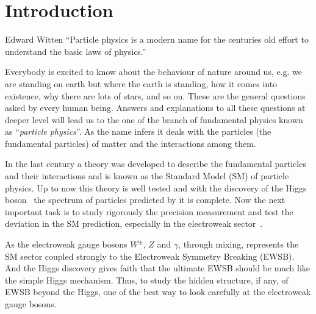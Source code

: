 \chapter{Introduction}
\begin{chapquote}
{Edward Witten}
``Particle physics is a modern name for the centuries old effort to understand the basic laws of physics.''
\end{chapquote}
Everybody is excited to know about the behaviour of nature around us, e.g. we are standing on earth but where the earth is standing, how it comes into existence, why there are lots of stars, and so on.
These are the general questions asked by every human being. Answers and explanations to all these questions at deeper level will lead us to the one of the branch of fundamental physics known as ``\textit{particle physics}''.
As the name infers it deals with the particles (the fundamental particles) of matter and the interactions among them.

In the last century a theory was developed to describe the fundamental particles and their interactions and is known as the Standard Model (SM) of particle physics.
Up to now this theory is well tested and with the discovery of the Higgs boson~\cite{Chatrchyan:2012xdj,Aad:2012tfa} the spectrum of particles predicted by it is complete.
Now the next important task is to study rigorously the precision measurement and test the deviation in the SM prediction, especially in the electroweak sector~\cite{Baak2013}.


As the electroweak gauge bosons $W^{\pm}$, $Z$ and $\gamma$, through mixing, represents the SM sector coupled strongly to the Electroweak Symmetry Breaking (EWSB).
And the Higgs discovery gives faith that the ultimate EWSB should be much like the simple Higgs mechanism.
Thus, to study the hidden structure, if any, of EWSB beyond the Higgs, one of the best way to look carefully at the electroweak gauge bosons.

